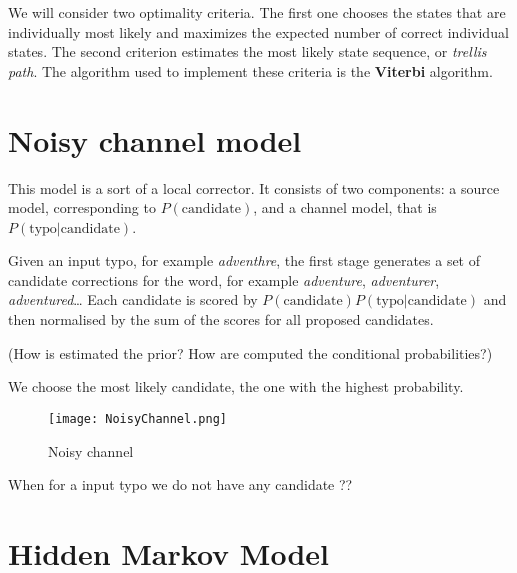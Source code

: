 We will consider two optimality criteria. The first one chooses the states that are individually most likely and maximizes the 
expected number of correct individual states. The second criterion estimates the most likely state sequence, or 
\textit{trellis path}. The algorithm used to implement these criteria is the \textbf{Viterbi} algorithm. %

\section{Noisy channel model}

This model is a sort of a local corrector. It consists of two components: a source model, corresponding to 
$P(\text{candidate})$, and a channel model, 
that is $P(\text{typo}|\text{candidate})$.


Given an input typo, for example \textsl{adventhre}, the first stage generates a set of candidate corrections for the word, 
for example \textsl{adventure}, \textsl{adventurer}, \textsl{adventured}…
Each candidate is scored by $P(\text{candidate})P(\text{typo}|\text{candidate})$ and then normalised by the sum of the 
scores for all proposed candidates.

(How is estimated the prior? How are computed the conditional probabilities?)%

We choose the most likely candidate, the one with the highest probability.

\begin{figure}[H]
	\centering
	\texttt{[image: NoisyChannel.png]}
	\caption{Noisy channel}
	\label{fig:noisychannel}
\end{figure}

When for a input typo we do not have any candidate ?? %
\section{Hidden Markov Model}


